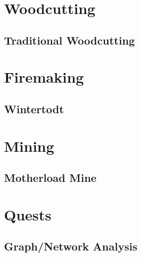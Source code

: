 \documentclass[10pt,a4paper]{report}
\begin{document}
	\part{Woodcutting}
		\chapter{Traditional Woodcutting}
			
	
	\part{Firemaking}
		\chapter{Wintertodt}
			
	
	\part{Mining}
		\chapter{Motherload Mine}
				
	
	\part{Quests}
		\chapter{Graph/Network Analysis}
			



\end{document}
